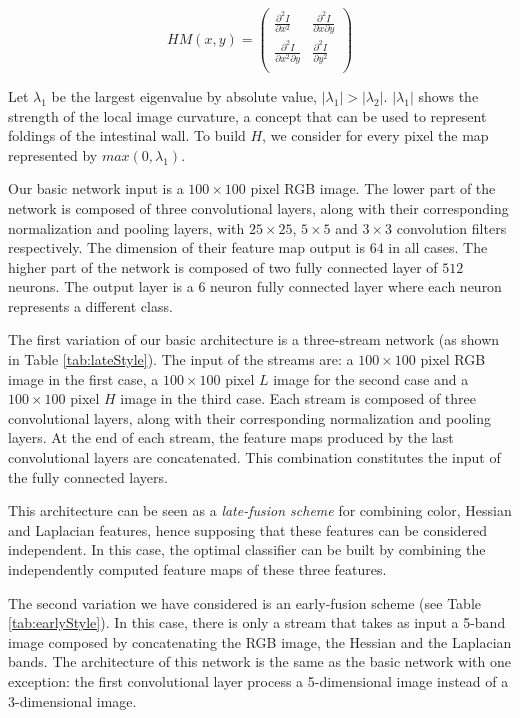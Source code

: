 \documentclass[review,12pt,3p]{elsarticle}
\begin{document}
$$
HM(x,y) =
\left( \begin{array}{cc}
\frac{\partial^2 I}{\partial x^2} & \frac{\partial^2 I}{\partial x \partial y}  \\
\frac{\partial^2 I}{\partial x^2 \partial y} & \frac{\partial^2 I}{\partial y^2}  \\ \end{array} \right)
$$

Let $\lambda_1$ be the largest eigenvalue by absolute value, $|\lambda_1| > |\lambda_2|$. $|\lambda_1|$ shows the strength of the local image curvature, a concept that can be used to represent foldings of the intestinal wall. To build $H$,  we consider for
every pixel the map represented by $max(0, \lambda_1)$.

Our basic network input is a $100 \times 100$ pixel RGB image. The lower part of the network is composed of three convolutional layers, along with their corresponding normalization and pooling layers, with $25 \times 25$, $5 \times 5$ and $3 \times 3$ convolution filters respectively.  The dimension of their feature map output is $64$ in all cases. The higher part of the network is composed of two fully connected layer of $512$ neurons. The output layer is a $6$ neuron fully connected layer where each neuron represents a different class.

The first variation of our basic architecture is a three-stream network (as shown in Table \ref{tab:lateStyle}). The input of the streams are: a  $100 \times 100$ pixel RGB image in the first case, a $100 \times 100$ pixel $L$ image for the second case and a $100 \times 100$ pixel $H$ image in the third case. Each stream is composed of three convolutional layers, along with their corresponding normalization and pooling layers. At the end of each stream, the feature maps produced by the last convolutional layers are concatenated. This combination constitutes the input of the fully connected layers.

This architecture can be seen as a {\em late-fusion scheme} for combining color, Hessian and Laplacian features, hence supposing that these features can be considered independent. In this case, the optimal classifier can be built by combining the independently computed feature maps of these three features.

The second variation we have considered is an early-fusion scheme (see Table \ref{tab:earlyStyle}). In this case, there is only a stream that takes as input a 5-band image composed by concatenating the RGB image, the Hessian and the Laplacian bands. The architecture of this network is the same as the basic network with one exception: the first convolutional layer process a 5-dimensional image instead of a 3-dimensional image.
\end{document}
